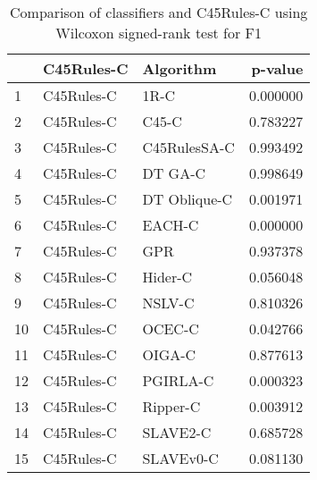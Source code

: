 \begin{table}
\footnotesize
\caption{Comparison of classifiers and C45Rules-C using Wilcoxon signed-rank test for F1}
\label{tab:C45Rules-C wilcoxon F1 comparison}
\begin{tabular}{lllr}
\hline
 & C45Rules-C & Algorithm & p-value \\
\hline
1 & C45Rules-C & 1R-C & 0.000000 \\
2 & C45Rules-C & C45-C & 0.783227 \\
3 & C45Rules-C & C45RulesSA-C & 0.993492 \\
4 & C45Rules-C & DT GA-C & 0.998649 \\
5 & C45Rules-C & DT Oblique-C & 0.001971 \\
6 & C45Rules-C & EACH-C & 0.000000 \\
7 & C45Rules-C & GPR & 0.937378 \\
8 & C45Rules-C & Hider-C & 0.056048 \\
9 & C45Rules-C & NSLV-C & 0.810326 \\
10 & C45Rules-C & OCEC-C & 0.042766 \\
11 & C45Rules-C & OIGA-C & 0.877613 \\
12 & C45Rules-C & PGIRLA-C & 0.000323 \\
13 & C45Rules-C & Ripper-C & 0.003912 \\
14 & C45Rules-C & SLAVE2-C & 0.685728 \\
15 & C45Rules-C & SLAVEv0-C & 0.081130 \\
\hline
\end{tabular}
\end{table}
